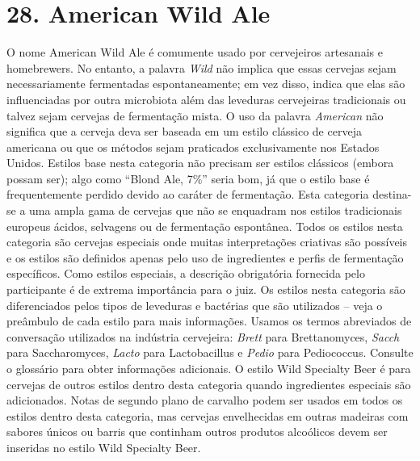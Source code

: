 \section*{28. American Wild Ale}

O nome American Wild Ale é comumente usado por cervejeiros artesanais e homebrewers. No entanto, a palavra \textit{Wild} não implica que essas cervejas sejam necessariamente fermentadas espontaneamente; em vez disso, indica que elas são influenciadas por outra microbiota além das leveduras cervejeiras tradicionais ou talvez sejam cervejas de fermentação mista. O uso da palavra \textit{American} não significa que a cerveja deva ser baseada em um estilo clássico de cerveja americana ou que os métodos sejam praticados exclusivamente nos Estados Unidos. Estilos base nesta categoria não precisam ser estilos clássicos (embora possam ser); algo como “Blond Ale, 7\%” seria bom, já que o estilo base é frequentemente perdido devido ao caráter de fermentação. Esta categoria destina-se a uma ampla gama de cervejas que não se enquadram nos estilos tradicionais europeus ácidos, selvagens ou de fermentação espontânea. Todos os estilos nesta categoria são cervejas especiais onde muitas interpretações criativas são possíveis e os estilos são definidos apenas pelo uso de ingredientes e perfis de fermentação específicos. Como estilos especiais, a descrição obrigatória fornecida pelo participante é de extrema importância para o juiz. Os estilos nesta categoria são diferenciados pelos tipos de leveduras e bactérias que são utilizados – veja o preâmbulo de cada estilo para mais informações. Usamos os termos abreviados de conversação utilizados na indústria cervejeira: \textit{Brett} para Brettanomyces, \textit{Sacch} para Saccharomyces, \textit{Lacto} para Lactobacillus e \textit{Pedio} para Pediococcus. Consulte o glossário para obter informações adicionais. O estilo Wild Specialty Beer é para cervejas de outros estilos dentro desta categoria quando ingredientes especiais são adicionados. Notas de segundo plano de carvalho podem ser usados em todos os estilos dentro desta categoria, mas cervejas envelhecidas em outras madeiras com sabores únicos ou barris que continham outros produtos alcoólicos devem ser inseridas no estilo Wild Specialty Beer.
